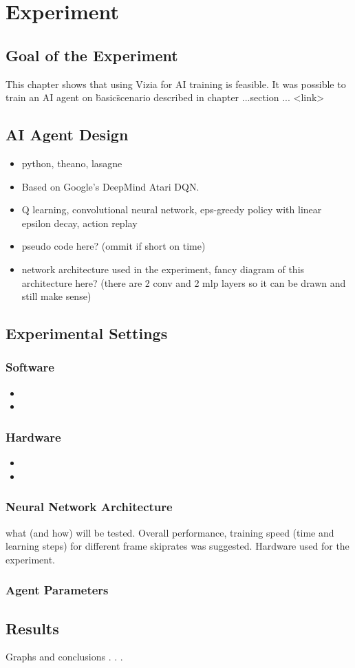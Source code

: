 \chapter{Experiment}

\section{Goal of the Experiment}
This chapter shows that using Vizia for AI training is feasible. It was possible to train an AI agent on \"basic\" scenario described in chapter ...section ... <link> 

\section{AI Agent Design}
\begin{itemize}
\item python, theano, lasagne
\item Based on Google's DeepMind Atari DQN.
\item Q learning, convolutional neural network, eps-greedy policy with linear epsilon decay, action replay
\item pseudo code here? (ommit if short on time)
\item network architecture used in the experiment, fancy diagram of this architecture here? (there are 2 conv and 2 mlp layers so it can be drawn and still make sense)
\end{itemize}

\section{Experimental Settings} 

\subsection{Software}
\begin{itemize}
	\item
	\item
\end{itemize}

\subsection{Hardware}
\begin{itemize}
	\item
	\item
\end{itemize}

\subsection{Neural Network Architecture}
what (and how) will be tested. Overall performance, training speed (time and learning steps) for different frame skiprates was suggested.
Hardware used for the experiment.

\subsection{Agent Parameters}

\section{Results}
Graphs and conclusions . . .